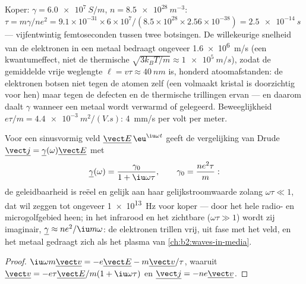 \begin{example}\label{ex:b2:charges-currents-conduction:copper}
Koper: $\gamma = \qty{6.0e7}{S/m}$, $n = \qty{8.5e28}{m^{-3}}$:
$\tau = m\gamma/ne^2 =
9.1 \times 10^{-31} \times 6 \times 10^7/(8.5 \times 10^{28} \times 2.56 \times 10^{-38}) = \qty{2.5e-14}{s}$
--- vijfentwintig femtoseconden tussen twee botsingen. De willekeurige
snelheid van de elektronen in een metaal bedraagt ongeveer \qty{1.6e6}{m/s}
(een kwantumeffect, niet de thermische
$\sqrt{3k_BT/m} \approx \qty{1e5}{m/s}$), zodat de gemiddelde vrije
weglengte $\ell
= v\tau \approx \qty{40}{nm}$ is, honderd atoomafstanden: de
elektronen botsen niet tegen de atomen zelf (een volmaakt kristal is
doorzichtig voor hen) maar tegen de defecten en de thermische trillingen
ervan --- en daarom daalt $\gamma$ wanneer een metaal wordt verwarmd of
gelegeerd. Beweeglijkheid $e\tau/m =
\qty{4.4e-3}{m^2/(V.s)}$: \qty{4}{mm/s}
per volt per meter.
\end{example}

\begin{proposition}\label{prop:b2:charges-currents-conduction:acdrude}
Voor een sinusvormig veld $\underline{\vect E}\,\eu^{\iu\omega t}$ geeft de
vergelijking van Drude
$\underline{\vect j} = \underline\gamma(\omega)\underline{\vect E}$ met
\[
\underline\gamma(\omega) = \frac{\gamma_0}{1 + \iu\omega\tau} , \qquad \gamma_0 = \frac{ne^2\tau}{m} :
\]
de geleidbaarheid is reëel en gelijk aan haar gelijkstroomwaarde zolang
$\omega\tau
\ll 1$, dat wil zeggen tot ongeveer \qty{1e13}{Hz} voor koper
--- door het hele radio- en microgolfgebied heen; in het infrarood en het
zichtbare ($\omega\tau \gg 1$) wordt zij imaginair,
$\underline\gamma \approx ne^2/\iu m\omega$: de elektronen trillen vrij, uit
fase met het veld, en het metaal gedraagt zich als het plasma van
\cref{ch:b2:waves-in-media}.
\end{proposition}

\begin{proof}
$\iu\omega m\underline{\vect v} = -e\underline{\vect E} - m\underline{\vect v}/\tau$,
waaruit
$\underline{\vect v} = -e\tau\underline{\vect E}/m(1 + \iu\omega\tau)$ en
$\underline{\vect j}
= -ne\underline{\vect v}$.
\end{proof}


